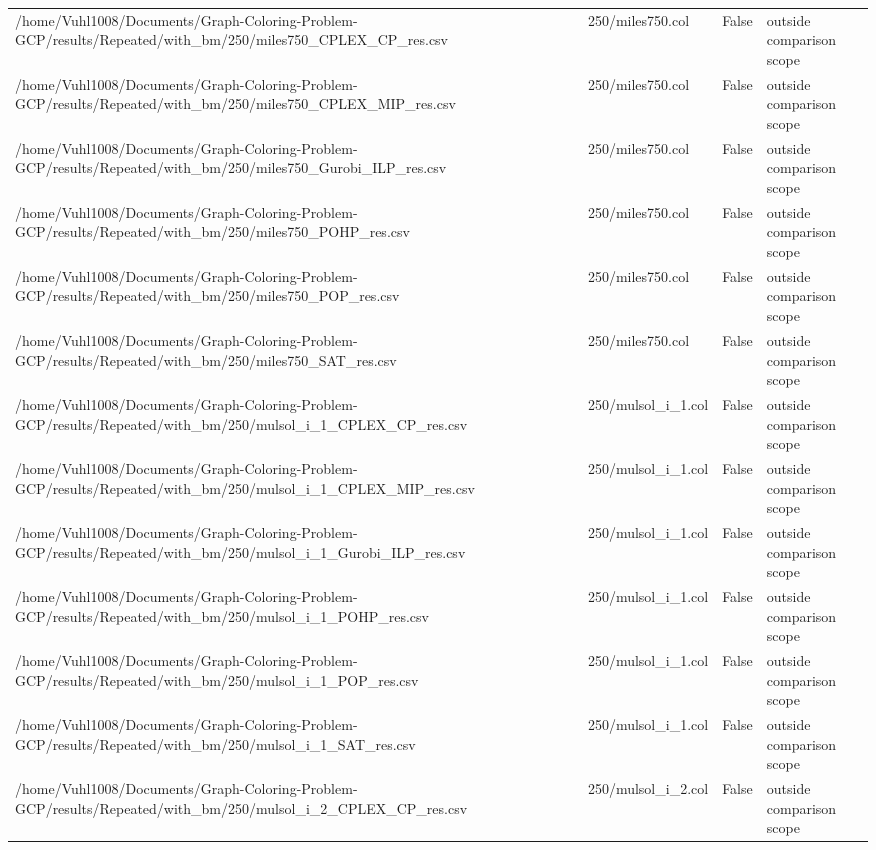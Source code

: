\begin{table}[htbp]
\begin{tabular}{llll}
/home/Vuhl1008/Documents/Graph-Coloring-Problem-GCP/results/Repeated/with\_bm/250/miles750\_CPLEX\_CP\_res.csv & 250/miles750.col & False & outside comparison scope \\
/home/Vuhl1008/Documents/Graph-Coloring-Problem-GCP/results/Repeated/with\_bm/250/miles750\_CPLEX\_MIP\_res.csv & 250/miles750.col & False & outside comparison scope \\
/home/Vuhl1008/Documents/Graph-Coloring-Problem-GCP/results/Repeated/with\_bm/250/miles750\_Gurobi\_ILP\_res.csv & 250/miles750.col & False & outside comparison scope \\
/home/Vuhl1008/Documents/Graph-Coloring-Problem-GCP/results/Repeated/with\_bm/250/miles750\_POHP\_res.csv & 250/miles750.col & False & outside comparison scope \\
/home/Vuhl1008/Documents/Graph-Coloring-Problem-GCP/results/Repeated/with\_bm/250/miles750\_POP\_res.csv & 250/miles750.col & False & outside comparison scope \\
/home/Vuhl1008/Documents/Graph-Coloring-Problem-GCP/results/Repeated/with\_bm/250/miles750\_SAT\_res.csv & 250/miles750.col & False & outside comparison scope \\
/home/Vuhl1008/Documents/Graph-Coloring-Problem-GCP/results/Repeated/with\_bm/250/mulsol\_i\_1\_CPLEX\_CP\_res.csv & 250/mulsol\_i\_1.col & False & outside comparison scope \\
/home/Vuhl1008/Documents/Graph-Coloring-Problem-GCP/results/Repeated/with\_bm/250/mulsol\_i\_1\_CPLEX\_MIP\_res.csv & 250/mulsol\_i\_1.col & False & outside comparison scope \\
/home/Vuhl1008/Documents/Graph-Coloring-Problem-GCP/results/Repeated/with\_bm/250/mulsol\_i\_1\_Gurobi\_ILP\_res.csv & 250/mulsol\_i\_1.col & False & outside comparison scope \\
/home/Vuhl1008/Documents/Graph-Coloring-Problem-GCP/results/Repeated/with\_bm/250/mulsol\_i\_1\_POHP\_res.csv & 250/mulsol\_i\_1.col & False & outside comparison scope \\
/home/Vuhl1008/Documents/Graph-Coloring-Problem-GCP/results/Repeated/with\_bm/250/mulsol\_i\_1\_POP\_res.csv & 250/mulsol\_i\_1.col & False & outside comparison scope \\
/home/Vuhl1008/Documents/Graph-Coloring-Problem-GCP/results/Repeated/with\_bm/250/mulsol\_i\_1\_SAT\_res.csv & 250/mulsol\_i\_1.col & False & outside comparison scope \\
/home/Vuhl1008/Documents/Graph-Coloring-Problem-GCP/results/Repeated/with\_bm/250/mulsol\_i\_2\_CPLEX\_CP\_res.csv & 250/mulsol\_i\_2.col & False & outside comparison scope \\

\end{tabular}
\end{table}
